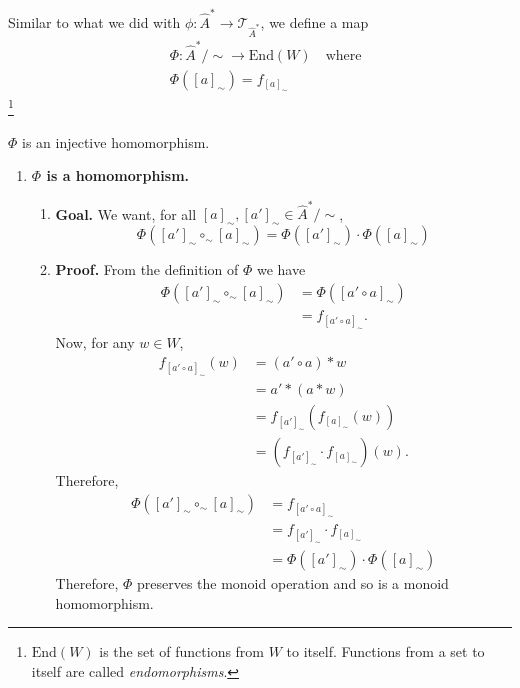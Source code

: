 Similar to what we did with $\phi: \hat{A}^{\ast} \to \mathcal{T}_{\hat{A}^{\ast}}$, we define a map
\begin{equation}
	\begin{aligned}
		 & \Phi : \hat{A}^{\ast}/\sim \to \text{End}(W) \quad \text{where} \\
		 & \Phi([a]_{\sim}) = f_{[a]_{\sim}}
	\end{aligned}
\end{equation}
\footnote{$\text{End}(W)$ is the set of functions from $W$ to itself.
	Functions from a set to itself are called \emph{endomorphisms}.}

\begin{propositionE}
    $\Phi$ is an injective homomorphism.
\end{propositionE}
\begin{proofE}
\begin{enumerate}
    \item \textbf{$\Phi$ is a homomorphism.}
    \begin{enumerate}
        \item \textbf{Goal.}
        We want, for all $[a]_{\sim}, [a']_{\sim} \in \hat{A}^{\ast}/\sim$,
        \begin{equation}
            \Phi([a']_{\sim} \circ_\sim [a]_{\sim}) = \Phi([a']_{\sim}) \cdot \Phi([a]_{\sim})
        \end{equation}
        
        \item \textbf{Proof.}
        From the definition of $\Phi$ we have
        \begin{align}
            \Phi([a']_{\sim} \circ_\sim [a]_{\sim}) & = \Phi([a' \circ a]_{\sim}) \\
            & = f_{[a' \circ a]_{\sim}}.
        \end{align}
        Now, for any $w \in W$,
        \begin{align}
            f_{[a' \circ a]_{\sim}}(w) & = (a' \circ a) \ast w \\
            & = a' \ast (a \ast w)  \\
            & = f_{[a']_{\sim}}(f_{[a]_{\sim}}(w)) \\
            & = (f_{[a']_{\sim}} \cdot f_{[a]_{\sim}})(w).
        \end{align}
        Therefore,
        \begin{align}
            \Phi([a']_{\sim} \circ_\sim [a]_{\sim}) & = f_{[a' \circ a]_{\sim}} \\
            & = f_{[a']_{\sim}} \cdot f_{[a]_{\sim}} \\
            & = \Phi([a']_{\sim}) \cdot \Phi([a]_{\sim})
        \end{align}
        Therefore, $\Phi$ preserves the monoid operation and so is a monoid homomorphism.
    \end{enumerate}
    

\end{enumerate}
\end{proofE}
